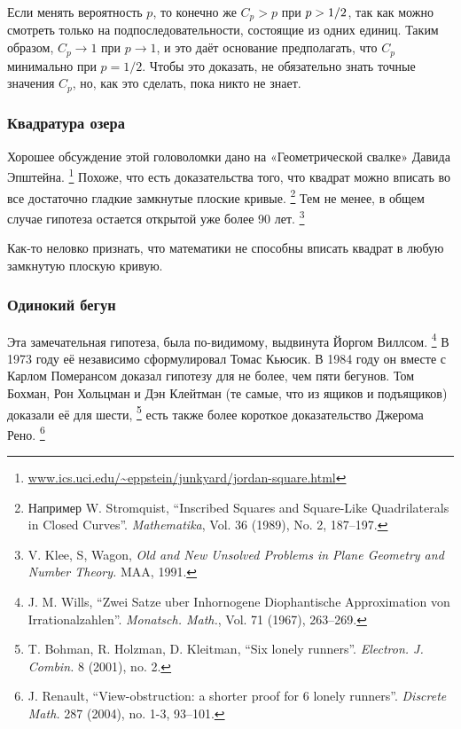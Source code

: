 Если менять вероятность $p$, то конечно же $C_p>p$ при $p \z> 1/2$, так как можно смотреть только на подпоследовательности, состоящие из одних единиц.
Таким образом, $C_p\to 1$ при $p\to 1$, и это даёт основание предполагать, что $C_p$ минимально при $p=1/2$.
Чтобы это доказать, не обязательно знать точные значения $C_p$,
но, как это сделать, пока никто не знает.

\subsubsection*{Квадратура озера}

Хорошее обсуждение этой головоломки дано на «Геометрической свалке» Давида Эпштейна.%
\footnote{\href{http://www.ics.uci.edu/~eppstein/junkyard/jordan-square.html}{\url{www.ics.uci.edu/~eppstein/junkyard/jordan-square.html}}}
Похоже, что есть доказательства того, что квадрат можно вписать во все достаточно гладкие замкнутые плоские кривые.%
\footnote{Например W. Stromquist, ``Inscribed Squares and Square-Like Quadrilaterals in Closed Curves''. \emph{Mathematika}, Vol. 36 (1989), No. 2, 187--197.}
Тем не менее, в общем случае гипотеза остается открытой уже более 90 лет.%
\footnote{V. Klee, S, Wagon, \emph{Old and New Unsolved Problems in Plane Geometry and Number Theory.} MAA, 1991.}

\medskip

Как-то неловко признать, что математики не способны вписать квадрат в любую замкнутую плоскую кривую.

\subsubsection*{Одинокий бегун}

Эта замечательная гипотеза, была по-видимому, выдвинута Йоргом Виллсом.%
\footnote{J. M. Wills, ``Zwei Satze uber Inhornogene Diophantische Approximation von Irrationalzahlen''. \emph{Monatsch. Math.}, Vol. 71 (1967), 263--269.}
В 1973 году её независимо сформулировал Томас Кьюсик.
В 1984 году он вместе с Карлом Померансом доказал гипотезу для не более, чем пяти бегунов.
Том Бохман, Рон Хольцман и Дэн Клейтман (те самые, что из ящиков и подъящиков) доказали её для шести,%
\footnote{T. Bohman, R. Holzman, D. Kleitman,
``Six lonely runners''.
\emph{Electron. J. Combin.} 8 (2001), no. 2.
}
есть также более короткое доказательство Джерома Рено.%
\footnote{J. Renault, ``View-obstruction: a shorter proof for 6 lonely runners''. \emph{Discrete Math.} 287 (2004), no. 1-3, 93--101.}

